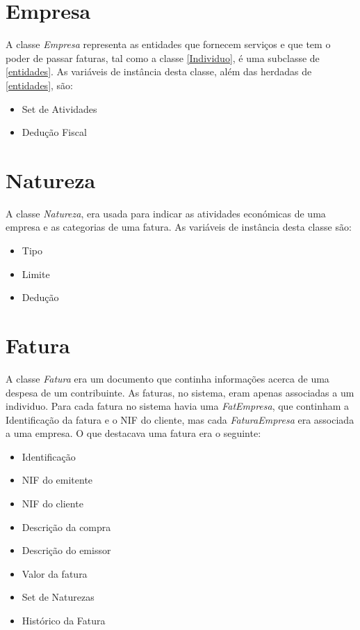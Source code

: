 \documentclass[10pt, a4paper]{report}
\begin{document}
\section{Empresa}\label{Empresa}

A classe \emph{Empresa} representa as entidades que fornecem serviços e que tem o poder de passar faturas, tal como a classe \ref{Individuo}, é uma subclasse de \ref{entidades}. As variáveis de instância desta classe, além das herdadas de \ref{entidades}, são:
\begin{itemize}
	\item Set de Atividades
	\item Dedução Fiscal
\end{itemize}

\section{Natureza}\label{Nat}

A classe \emph{Natureza}, era usada para indicar as atividades económicas de uma empresa e as categorias de uma fatura.
As variáveis de instância desta classe são:

\begin{itemize}
	\item Tipo
	\item Limite
	\item Dedução 
\end{itemize}

\section{Fatura}\label{Fatura}

A classe \emph{Fatura} era um documento que continha informações acerca de uma despesa de um contribuinte. As faturas, no sistema, eram apenas associadas a um individuo. Para cada fatura no sistema havia uma \emph{FatEmpresa}, que continham a Identificação da fatura e o NIF do cliente, mas cada \emph{FaturaEmpresa} era associada a uma empresa. O que destacava uma fatura era o seguinte:

\begin{itemize}
	\item Identificação
	\item NIF do emitente
	\item NIF do cliente
	\item Descrição da compra
	\item Descrição do emissor
	\item Valor da fatura
	\item Set de Naturezas
	\item Histórico da Fatura
\end{itemize}
\end{document}

